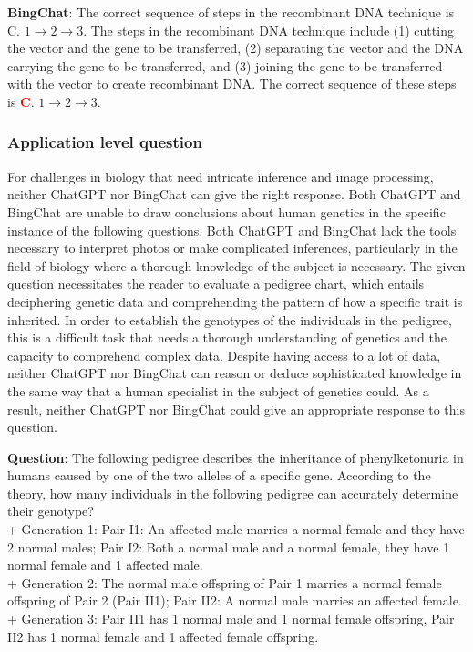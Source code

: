 \documentclass{article}
\begin{document}
{\begin{mdframed}[linewidth=1pt,linecolor=red]
		\textbf{BingChat}: The correct sequence of steps in the recombinant DNA technique is C. $1 \rightarrow 2 \rightarrow 3$.
		The steps in the recombinant DNA technique include (1) cutting the vector and the gene to be transferred, (2) separating the vector and the DNA carrying the gene to be transferred, and (3) joining the gene to be transferred with the vector to create recombinant DNA. The correct sequence of these steps is \textcolor{red}{\textbf{C}}. $1 \rightarrow 2 \rightarrow 3$.
		
	\end{mdframed}	
	
	\subsubsection{Application level question}
	\label{VNHSGE_Bio_A}
	
	For challenges in biology that need intricate inference and image processing, neither ChatGPT nor BingChat can give the right response. Both ChatGPT and BingChat are unable to draw conclusions about human genetics in the specific instance of the following questions. Both ChatGPT and BingChat lack the tools necessary to interpret photos or make complicated inferences, particularly in the field of biology where a thorough knowledge of the subject is necessary. The given question necessitates the reader to evaluate a pedigree chart, which entails deciphering genetic data and comprehending the pattern of how a specific trait is inherited. In order to establish the genotypes of the individuals in the pedigree, this is a difficult task that needs a thorough understanding of genetics and the capacity to comprehend complex data. Despite having access to a lot of data, neither ChatGPT nor BingChat can reason or deduce sophisticated knowledge in the same way that a human specialist in the subject of genetics could. As a result, neither ChatGPT nor BingChat could give an appropriate response to this question.
	
	
	
	\begin{mdframed}[linewidth=1pt,linecolor=red] \textbf{Question}: The following pedigree describes the inheritance of phenylketonuria in humans caused by one of the two alleles of a specific gene. According to the theory, how many individuals in the following pedigree can accurately determine their genotype?\\	
		+ Generation 1: Pair I1: An affected male marries a normal female and they have 2 normal males; Pair I2: Both a normal male and a normal female, they have 1 normal female and 1 affected male. \\
		+ Generation 2: The normal male offspring of Pair 1 marries a normal female offspring of Pair 2 (Pair II1); Pair II2: A normal male marries an affected female. \\
		+ Generation 3: Pair II1 has 1 normal male and 1 normal female offspring, Pair II2 has 1 normal female and 1 affected female offspring.
		

\end{mdframed}}
\end{document}
